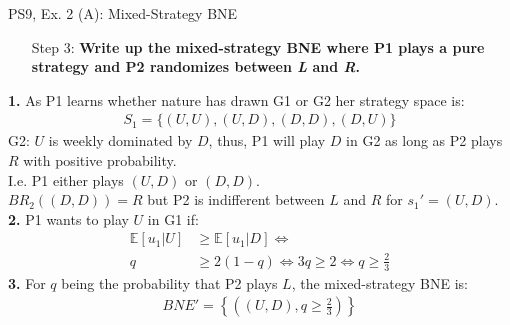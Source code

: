 \begin{frame}{PS9, Ex. 2 (A): Mixed-Strategy BNE}
\begin{multicols}{2}
\begin{itemize}
        \item[Step 3:] \textbf{Write up the mixed-strategy BNE where P1 plays a pure strategy and P2 randomizes between \textit{L} and \textit{R}.}
      \end{itemize}
      \vfill\null\columnbreak
      \textbf{1.} As P1 learns whether nature has drawn G1 or G2 her strategy space is:
      \begin{align*}
        S_1=\{(U,U),(U,D),(D,D),(D,U)\}
      \end{align*}
      G2: $U$ is weekly dominated by $D$, thus, P1 will play $D$ in G2 as long as P2 plays $R$ with positive probability.\\\medskip I.e. P1 either plays $(U,D)$ or $(D,D)$.\\\medskip
      $BR_2((D,D))=R$ but P2 is indifferent between $L$ and $R$ for $s_1'=(U,D)$.\\\medskip
      \textbf{2.} P1 wants to play $U$ in G1 if:
      \begin{align*}
        \mathbb{E}[u_1|U]&\geq \mathbb{E}[u_1|D]\Leftrightarrow\\
        q&\geq2(1-q)\Leftrightarrow 3q\geq2 \Leftrightarrow q\geq\frac{2}{3}
      \end{align*}
      \textbf{3.} For $q$ being the probability that P2 plays $L$, the mixed-strategy BNE is:
      \begin{align*}
        BNE'=\left\{\left((U,D),q\geq\frac{2}{3}\right)\right\}
      \end{align*}
      \vfill\null
    \end{multicols}
\end{frame}
